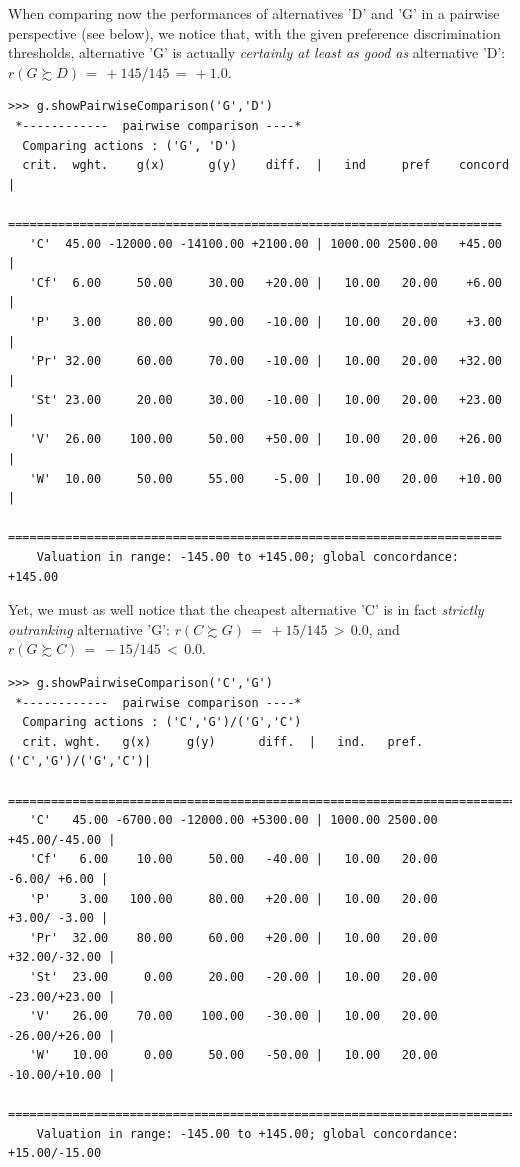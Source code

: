 When comparing now the performances of alternatives 'D' and 'G' in a pairwise perspective (see below), we notice that, with the given preference discrimination thresholds, alternative 'G' is actually \emph{certainly at least as good as} alternative 'D':  $r(G \succsim D)\, = \, +145/145\, =\, +1.0$.
\begin{lstlisting}[caption={Inspecting pairwise comparisons},label=list:6.5,basicstyle=\ttfamily\scriptsize]
>>> g.showPairwiseComparison('G','D')
 *------------  pairwise comparison ----*
  Comparing actions : ('G', 'D')
  crit.  wght.    g(x)      g(y)    diff.  |   ind     pref    concord 	|
   =====================================================================
   'C'  45.00 -12000.00 -14100.00 +2100.00 | 1000.00 2500.00   +45.00 	| 
   'Cf'  6.00     50.00     30.00   +20.00 |   10.00   20.00    +6.00 	| 
   'P'   3.00     80.00     90.00   -10.00 |   10.00   20.00    +3.00 	| 
   'Pr' 32.00     60.00     70.00   -10.00 |   10.00   20.00   +32.00 	| 
   'St' 23.00     20.00     30.00   -10.00 |   10.00   20.00   +23.00 	| 
   'V'  26.00    100.00     50.00   +50.00 |   10.00   20.00   +26.00 	| 
   'W'  10.00     50.00     55.00    -5.00 |   10.00   20.00   +10.00 	|
   =====================================================================
    Valuation in range: -145.00 to +145.00; global concordance: +145.00
\end{lstlisting}

Yet, we must as well notice that the cheapest alternative 'C' is in fact \emph{strictly outranking} alternative 'G':  $r(C \succsim G)\, =\, +15/145\, >\, 0.0$, and $r(G \succsim C)\, =\, -15/145 \,<\, 0.0$.
\begin{lstlisting}[basicstyle=\ttfamily\scriptsize]
>>> g.showPairwiseComparison('C','G')
 *------------  pairwise comparison ----*
  Comparing actions : ('C','G')/('G','C')
  crit. wght.   g(x)     g(y)      diff.  |   ind.   pref. ('C','G')/('G','C')|
   ===========================================================================
   'C'   45.00 -6700.00 -12000.00 +5300.00 | 1000.00 2500.00    +45.00/-45.00 | 
   'Cf'   6.00    10.00     50.00   -40.00 |   10.00   20.00     -6.00/ +6.00 | 
   'P'    3.00   100.00     80.00   +20.00 |   10.00   20.00     +3.00/ -3.00 | 
   'Pr'  32.00    80.00     60.00   +20.00 |   10.00   20.00    +32.00/-32.00 | 
   'St'  23.00     0.00     20.00   -20.00 |   10.00   20.00    -23.00/+23.00 | 
   'V'   26.00    70.00    100.00   -30.00 |   10.00   20.00    -26.00/+26.00 | 
   'W'   10.00     0.00     50.00   -50.00 |   10.00   20.00    -10.00/+10.00 |
   ===========================================================================
    Valuation in range: -145.00 to +145.00; global concordance: +15.00/-15.00
\end{lstlisting}

